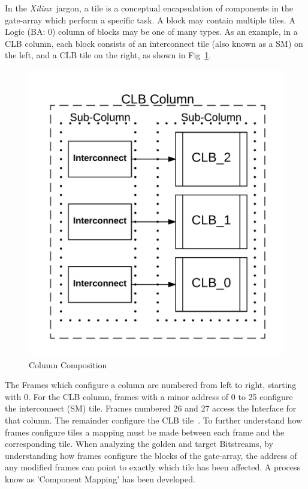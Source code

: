 \documentclass[conference]{IEEEtran}
\newcommand{\Xilinx}{\textit{\gls{Xilinx}}~}
\begin{document}
In the \Xilinx jargon, a tile is a conceptual encapsulation of components in the gate-array which perform a specific task.
A block may contain multiple tiles.
A Logic (BA: 0) column of blocks may be one of many types.
As an example, in a \acrfull{CLB} column, each block consists of an interconnect tile (also known as a \acrfull{SM}) on the left, and a \acrshort{CLB} tile on the right, as shown in Fig~\ref{fig:column}.
\begin{figure}[h]
	\centering
	\includegraphics[width=0.8\linewidth]{Figures/column}
	\caption[Column Composition]{Column Composition}
	\label{fig:column}
\end{figure}

The Frames which configure a column are numbered from left to right, starting with 0.  
For the \acrfull{CLB} column, frames with a minor address of 0 to 25 configure the interconnect (\acrshort{SM}) tile.
Frames numbered 26 and 27 access the Interface for that column. 
The remainder configure the \acrshort{CLB} tile~\cite{virtex5ConfigGuide}.
To further understand how frames configure tiles a mapping must be made between each frame and the corresponding tile.
When analyzing the \gls{golden} and \gls{target} \gls{Bitstream}s, by understanding how frames configure the blocks of the gate-array, the address of any modified frames can point to exactly which tile has been affected.
A process know as 'Component Mapping' has been developed. 

\end{document}
